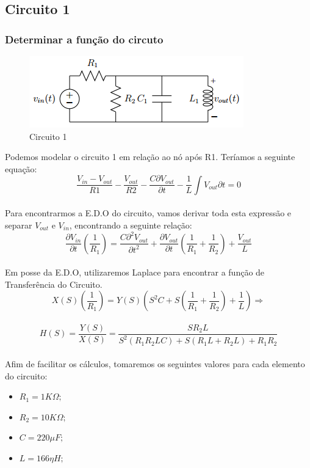 \documentclass[a4paper, 12pt]{article}
\begin{document}
		\subsection{Circuito 1}

			\subsubsection{Determinar a função do circuto}
			\begin{figure}[!ht]
				\centering
				\includegraphics{img/circuito1.png}
				\caption{Circuito 1}	
			\end{figure}			
			Podemos modelar o circuito 1 em relação ao nó após R1. Teríamos a seguinte equação: \\
			\[
				\frac{V_{in} - V_{out}}{R1} - \frac{V_{out}}{R2} - \frac{C\partial V_{out}}{\partial t} - \frac{1}{L} \int V_{out}{\partial t} = 0
			\] 	\\
			Para encontrarmos a E.D.O do circuito, vamos derivar toda esta expressão e separar $V_{out}$ e $V_{in}$, encontrando a seguinte relação:
			\[
				\frac{\partial V_{in}}{\partial t} \left(\frac{1}{R_{1}}\right) = \frac{C \partial^{2} V_{out}}{\partial t^{2}} + \frac{\partial V_{out}}{\partial t} \left(\frac{1}{R_{1}} + \frac{1}{R_{2}} \right) + \frac{V_{out}}{L}
			\] 	\\			
			Em posse da E.D.O, utilizaremos Laplace para encontrar a função de Transferência do Circuito.
			\[
				X(S) \left(\frac{1}{R_{1}}\right) = Y(S)\left(S^{2}C + S \left(\frac{1}{R_{1}} + \frac{1}{R_{2}}\right) + \frac{1}{L} \right) \Rightarrow
			\] 	\\	
			\[
				H(S) = \frac{Y(S)}{X(S)} = \frac{SR_{2}L}{S^{2}\left(R_{1}R_{2}LC\right) + S\left(R_{1}L + R_{2}L\right) + R_{1}R_{2}}
			\] 	\\		
			
			Afim de facilitar os cálculos, tomaremos os seguintes valores para cada elemento do circuito:
			 \begin{itemize}
				\item $R_{1} = 1K \Omega;$
				\item $R_{2} = 10K \Omega;$
				\item $C = 220\mu F;$
				\item $L = 166\eta H;$
			 \end{itemize}		
			 
\end{document}
